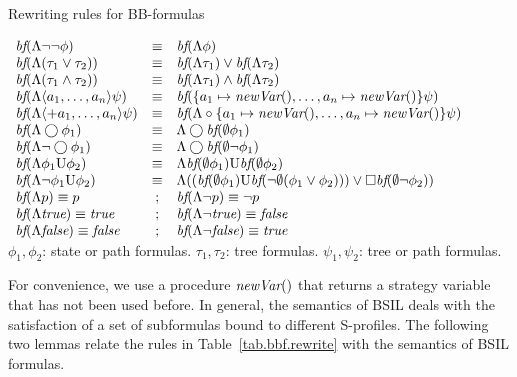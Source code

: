 \begin{table*}[t!]
\caption{Rewriting rules for BB-formulas}
\label{tab.bbf.rewrite}
\begin{center}
$\begin{array}{lcl} 
\textit{bf}(\Lambda\neg\neg\phi) 
& \equiv & \textit{bf}(\Lambda\phi)\\
\textit{bf}(\Lambda(\tau_1\vee\tau_2)) 
& \equiv & \textit{bf}(\Lambda \tau_1)\vee\textit{bf}(\Lambda \tau_2)\\
\textit{bf}(\Lambda(\tau_1\wedge\tau_2)) 
& \equiv & \textit{bf}(\Lambda\tau_1)\wedge\textit{bf}(\Lambda\tau_2)\\
\textit{bf}(\Lambda \langle a_1,\ldots,a_n\rangle\psi) 
& \equiv & \textit{bf}(\{a_1\mapsto \textit{newVar}(), \ldots, a_n\mapsto \textit{newVar}()\}\psi)\\
\textit{bf}(\Lambda \langle+ a_1,\ldots,a_n\rangle\psi) 
& \equiv & \textit{bf}(\Lambda\circ\{a_1\mapsto \textit{newVar}(), \ldots, a_n\mapsto \textit{newVar}()\}\psi)\\
\textit{bf}(\Lambda \bigcirc\phi_1) 
& \equiv & \Lambda\bigcirc\textit{bf}(\emptyset\phi_1)\\
\textit{bf}(\Lambda \neg\bigcirc\phi_1) 
& \equiv & \Lambda\bigcirc\textit{bf}(\emptyset\neg\phi_1)\\
\textit{bf}(\Lambda \phi_1\textrm{U}\phi_2) 
& \equiv & \Lambda\textit{bf}(\emptyset\phi_1)\textrm{U}\textit{bf}(\emptyset\phi_2)\\
\textit{bf}(\Lambda \neg\phi_1\textrm{U}\phi_2) 
& \equiv & \Lambda((\textit{bf}(\emptyset\phi_1)
	\textrm{U}\textit{bf}(\neg\emptyset(\phi_1\vee\phi_2)))
           \vee \Box\textit{bf}(\emptyset\neg\phi_2))\\
\textit{bf}(\Lambda p) \equiv p 
&;  & \textit{bf}(\Lambda \neg p) \equiv \neg p\\
\textit{bf}(\Lambda \mbox{\em true}) \equiv \mbox{\em true}
&;  & \textit{bf}(\Lambda \neg\mbox{\em true}) \equiv \mbox{\em false}\\
\textit{bf}(\Lambda \mbox{\em false}) \equiv \mbox{\em false}
&;  & \textit{bf}(\Lambda \neg\mbox{\em false}) \equiv \mbox{\em true}\\
\end{array}$\\
$\phi_1,\phi_2$: state or path formulas.  
$\tau_1,\tau_2$: tree formulas.
$\psi_1,\psi_2$: tree or path formulas.
\end{center} 
\end{table*}
For convenience, we use a procedure $\textit{newVar}()$ that returns a
strategy variable that has not been used before.  
In general, the semantics of BSIL deals with the satisfaction 
of a set of subformulas bound to different S-profiles.  
The following two lemmas relate the 
rules in Table~\ref{tab.bbf.rewrite} 
with the semantics of BSIL formulas.  


